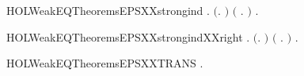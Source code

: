 \begin{SaveVerbatim}{HOLWeakEQTheoremsEPSXXstrongind}
\HOLTokenTurnstile{} \HOLSymConst{\HOLTokenForall{}}.
       \ensuremath{(}\HOLSymConst{\HOLTokenForall{}}.   \ensuremath{)} \HOLSymConst{\HOLTokenConj{}} \ensuremath{(}\HOLSymConst{\HOLTokenForall{}}  .  \HOLTokenTransBegin\HOLConst{\ensuremath{\tau}}\HOLTokenTransEnd {} \HOLSymConst{\HOLTokenConj{}}    \HOLSymConst{\HOLTokenConj{}}    \HOLSymConst{\HOLTokenImp{}}   \ensuremath{)} \HOLSymConst{\HOLTokenImp{}}
       \HOLSymConst{\HOLTokenForall{}} .    \HOLSymConst{\HOLTokenImp{}}   
\end{SaveVerbatim}
\newcommand{\HOLWeakEQTheoremsEPSXXstrongind}{\UseVerbatim{HOLWeakEQTheoremsEPSXXstrongind}}
\begin{SaveVerbatim}{HOLWeakEQTheoremsEPSXXstrongindXXright}
\HOLTokenTurnstile{} \HOLSymConst{\HOLTokenForall{}}.
       \ensuremath{(}\HOLSymConst{\HOLTokenForall{}}.   \ensuremath{)} \HOLSymConst{\HOLTokenConj{}} \ensuremath{(}\HOLSymConst{\HOLTokenForall{}}  .    \HOLSymConst{\HOLTokenConj{}}    \HOLSymConst{\HOLTokenConj{}}  \HOLTokenTransBegin\HOLConst{\ensuremath{\tau}}\HOLTokenTransEnd {} \HOLSymConst{\HOLTokenImp{}}   \ensuremath{)} \HOLSymConst{\HOLTokenImp{}}
       \HOLSymConst{\HOLTokenForall{}} .    \HOLSymConst{\HOLTokenImp{}}   
\end{SaveVerbatim}
\newcommand{\HOLWeakEQTheoremsEPSXXstrongindXXright}{\UseVerbatim{HOLWeakEQTheoremsEPSXXstrongindXXright}}
\begin{SaveVerbatim}{HOLWeakEQTheoremsEPSXXTRANS}
\HOLTokenTurnstile{} \HOLSymConst{\HOLTokenForall{}}  .    \HOLSymConst{\HOLTokenConj{}}    \HOLSymConst{\HOLTokenImp{}}   
\end{SaveVerbatim}
